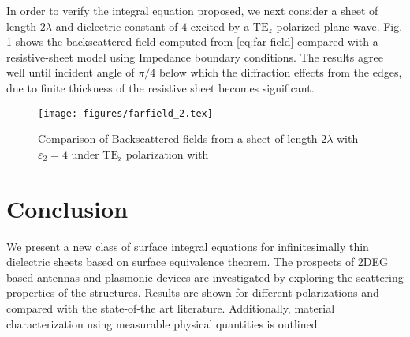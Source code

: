 \documentclass[conference, 10pt]{IEEEtran}
\newcommand{\E}{\varepsilon}  %
\renewcommand{\^}{\hat}  %
\begin{document}
 In order to verify the integral equation proposed, we next consider a sheet of length $2 \lambda$ and dielectric constant of $4$ excited by a $\mathrm{TE}_z$ polarized plane wave. Fig. \ref{fig:rcs} shows the backscattered field computed from \eqref{eq:far-field} compared with a resistive-sheet model \cite{senior1987sheet} using Impedance boundary conditions. The results agree well until incident angle of $\pi/4$ below which the diffraction effects from the edges, due to finite thickness of the resistive sheet becomes significant.
%
\begin{figure}[h]
  \begin{center}
    \noindent
    \texttt{[image: figures/farfield\_2.tex]}
    \caption{Comparison of Backscattered fields from a sheet of length $2\lambda$ with $\E_2 = 4$ under $\mathrm{TE_z}$ polarization with \cite{senior1987sheet}}
    \label{fig:rcs}
  \end{center}
\end{figure}
%   
\section{Conclusion}
%
We present a new class of surface integral equations for infinitesimally thin dielectric sheets based on surface equivalence theorem. The prospects of 2DEG based antennas and plasmonic devices are investigated by exploring the scattering properties of the structures. Results are shown for different polarizations and compared with the state-of-the art literature. Additionally, material characterization using measurable physical quantities is outlined.
%


\end{document}
